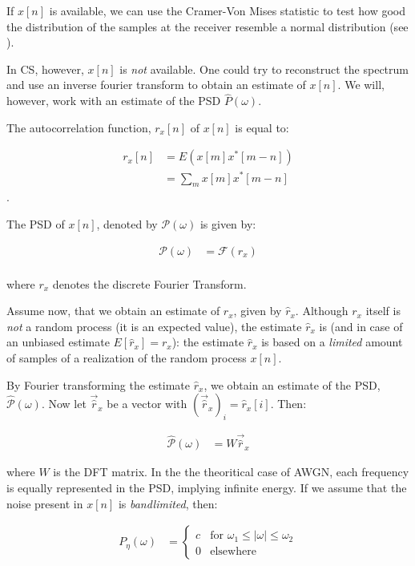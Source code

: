 \documentclass[a4paper, openany, oneside]{memoir}
\begin{document}
If $x[n]$ is available, we can use the Cramer-Von Mises statistic to test how good the distribution of the samples at the receiver resemble a normal
distribution (see \cite{}). 


In CS, however, $x[n]$ is \emph{not} available. One could try to reconstruct the spectrum and use an inverse fourier transform to obtain an estimate of $x[n]$. We will, however, work with an estimate of the PSD $\hat{P}(\omega)$.

The autocorrelation function, $r_x[n]$ of $x[n]$ is equal to:

\begin{align*}
	r_x[n] &= E ( x[m] x^{\ast}[m-n] ) \\
	          &= \sum_m x[m] x^{\ast}[m-n]
\end{align*}
.

The PSD of $x[n]$, denoted by $\mathcal{P}(\omega)$ is given by:

\begin{align*}
	\mathcal{P}(\omega) &= \mathcal{F}(r_x) \\
\end{align*}

where $r_x$ denotes the discrete Fourier Transform. 

Assume now, that we obtain an estimate of $r_x$, given by $\hat{r}_x$. Although $r_x$ itself is \emph{not} a random process (it is an  expected value), the estimate $\hat{r}_x$ is (and in case of an unbiased estimate $E[\hat{r}_x] = r_x$): the estimate $\hat{r}_x$ is based on a \emph{limited} amount of samples of a realization of the random process $x[n]$. 

By Fourier transforming the estimate $\hat{r}_x$, we obtain an estimate of the PSD, $\hat{\mathcal{P}}(\omega)$. Now let $\vec{\hat{r}}_x$ be a vector with $(\vec{\hat{r}}_x)_i = \hat{r}_x[i]$. Then:

\begin{align*}
	\hat{\mathcal{P}}(\omega) &= W \vec{\hat{r}}_x
\end{align*}

where $W$ is the DFT matrix. In the the theoritical case of AWGN, each frequency is equally represented in the PSD, implying infinite energy.
If we assume that the noise present in $x[n]$ is \emph{bandlimited}, then: 

\begin{align*}
	P_\eta(\omega) &= \begin{cases}
	c & \text{for $\omega_1 \leq |\omega| \leq \omega_2$} \\
	0 & \text{elsewhere}
	\end{cases} 
\end{align*}
\end{document}
